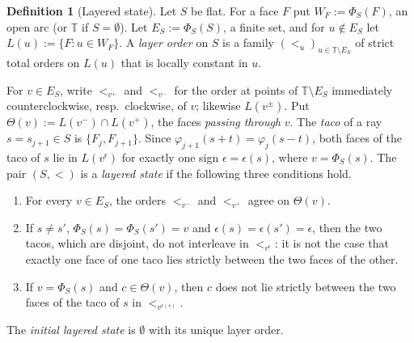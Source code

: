 \documentclass[11pt]{amsart}
\theoremstyle{definition}
\newtheorem{definition}[theorem]{Definition}
\theoremstyle{remark}
\newcommand{\T}{\mathbb{T}}
\begin{document}
\begin{definition}[Layered state]\label{def:layer}
Let $S$ be flat. For a face $F$ put $W_F:=\Phi_S(F)$, an open arc (or $\T$ if $S=\emptyset$). Let $E_S:=\Phi_S(S)$, a
finite set, and for $u\notin E_S$ let $L(u):=\{F : u\in W_F\}$.
A \emph{layer order} on $S$ is a family $(<_u)_{u\in\T\setminus E_S}$ of strict total orders on
$L(u)$ that is locally constant in $u$.

For $v\in E_S$, write $<_{v^+}$ and $<_{v^-}$ for the order at points of $\T\setminus E_S$
immediately counterclockwise, resp.\ clockwise, of $v$; likewise $L(v^\pm)$. Put
$\Theta(v):=L(v^-)\cap L(v^+)$, the faces \emph{passing through} $v$. The \emph{taco} of a ray
$s=s_{j+1}\in S$ is $\{F_j,F_{j+1}\}$. Since $\varphi_{j+1}(s+t)=\varphi_j(s-t)$, both faces of the
taco of $s$ lie in $L(v^{\epsilon})$ for exactly one sign $\epsilon=\epsilon(s)$, where
$v=\Phi_S(s)$. The pair $(S,<)$ is a \emph{layered state} if the following three conditions hold.
\begin{enumerate}[label=(O\arabic*)]
\item For every $v\in E_S$, the orders $<_{v^-}$ and $<_{v^+}$ agree on $\Theta(v)$.
\item If $s\ne s'$, $\Phi_S(s)=\Phi_S(s')=v$ and $\epsilon(s)=\epsilon(s')=\epsilon$, then the two
tacos, which are disjoint, do not interleave in $<_{v^\epsilon}$: it is not the case that
exactly one face of one taco lies strictly between the two faces of the other.
\item If $v=\Phi_S(s)$ and $c\in\Theta(v)$, then $c$ does not lie strictly between the two faces of
the taco of $s$ in $<_{v^{\epsilon(s)}}$.
\end{enumerate}
The \emph{initial layered state} is $\emptyset$ with its unique layer order.
\end{definition}
\end{document}
